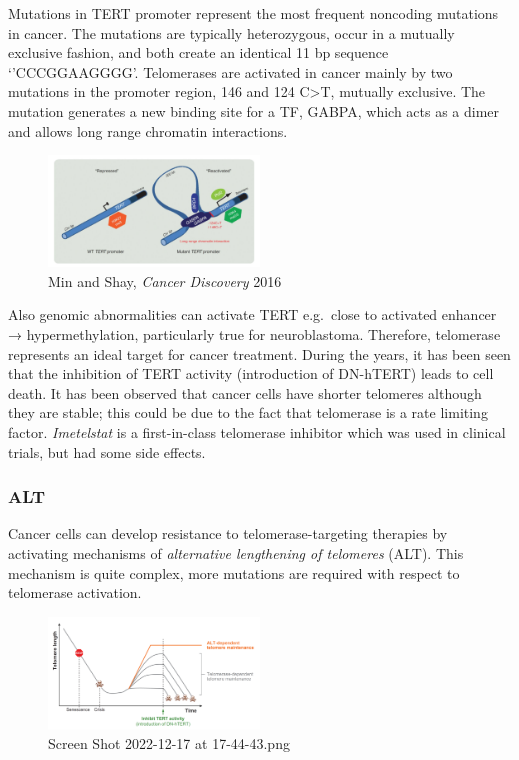 Mutations in TERT promoter represent the most frequent noncoding
mutations in cancer. The mutations are typically heterozygous, occur in
a mutually exclusive fashion, and both create an identical 11 bp
sequence `'CCCGGAAGGGG'. Telomerases are activated in cancer mainly by
two mutations in the promoter region, 146 and 124 C\textgreater T,
mutually exclusive. The mutation generates a new binding site for a TF,
GABPA, which acts as a dimer and allows long range chromatin
interactions.

\begin{figure}
\centering
\includegraphics[width=0.5\textwidth]{../_resources/Screen_Shot_2022-12-17_at_17-53-38.png}
\caption{Min and Shay, \emph{Cancer Discovery} 2016}
\end{figure}

Also genomic abnormalities can activate TERT e.g.~close to activated
enhancer → hypermethylation, particularly true for neuroblastoma.
Therefore, telomerase represents an ideal target for cancer treatment.
During the years, it has been seen that the inhibition of TERT activity
(introduction of DN-hTERT) leads to cell death. It has been observed
that cancer cells have shorter telomeres although they are stable; this
could be due to the fact that telomerase is a rate limiting factor.
\emph{Imetelstat} is a first-in-class telomerase inhibitor which was
used in clinical trials, but had some side effects.

\hypertarget{alt}{%
\subsubsection{ALT}\label{alt}}

Cancer cells can develop resistance to telomerase-targeting therapies by
activating mechanisms of \emph{alternative lengthening of telomeres}
(ALT). This mechanism is quite complex, more mutations are required with
respect to telomerase activation.

\begin{figure}
\centering
\includegraphics[width=0.5\textwidth]{../_resources/Screen_Shot_2022-12-17_at_17-44-43.png}
\caption{Screen Shot 2022-12-17 at 17-44-43.png}
\end{figure}

